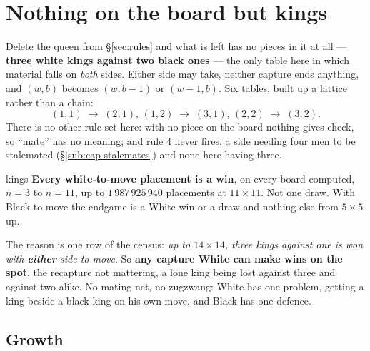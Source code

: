 \documentclass[10pt]{article}
\begin{document}
\medskip
{}

\section{Nothing on the board but kings}\label{sec:kings}

\noindent
Delete the queen from \S\ref{sec:rules} and what is left has no pieces in it at
all --- \textbf{three white kings against two black ones} --- the only table
here in which material falls on \emph{both} sides. Either side may take,
neither capture ends anything, and $(w,b)$ becomes $(w,b-1)$ or $(w-1,b)$. Six
tables, built up a lattice rather than a chain:
\[
  (1,1) \;\longrightarrow\; (2,1),\,(1,2) \;\longrightarrow\; (3,1),\,(2,2)
        \;\longrightarrow\; (3,2).
\]
There is no other rule set here: with no piece on the board nothing gives
check, so ``mate'' has no meaning; and rule 4 never fires, a side needing four
men to be stalemated (\S\ref{sub:cap-stalemates}) and none here having three.

\begin{result}[title={Three kings beat two, and it is not close}]{kings}
\textbf{Every white-to-move placement is a win}, on every board computed,
$n=3$ to $n=11$, up to $1\,987\,925\,940$ placements at $11\times11$. Not one
draw. With Black to move the endgame is a White win or a draw and nothing else
from $5\times5$ up.

\smallskip
The reason is one row of the census: \emph{up to $14\times14$, three kings
against one is won with \textbf{either} side to move}. So \textbf{any capture
White can make wins on the spot}, the recapture not mattering, a lone king
being lost against three and against two alike. No mating net, no zugzwang:
White has one problem, getting a king beside a black king on his own move, and
Black has one defence.
\end{result}

\subsection{Growth}\label{sub:kings-growth}
\end{document}
